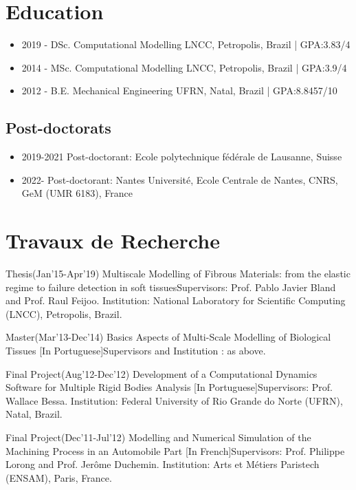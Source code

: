 \documentclass[french]{article}
\begin{document}
\section{Education}
\begin{itemize}
\item 2019 - DSc. Computational Modelling LNCC, Petropolis, Brazil | GPA:3.83/4 \vskip 0.1cm
\item 2014 - MSc. Computational Modelling LNCC, Petropolis, Brazil | GPA:3.9/4 \vskip 0.1cm
\item 2012 - B.E. Mechanical Engineering UFRN, Natal, Brazil | GPA:8.8457/10 %
\end{itemize}

\subsection{Post-doctorats}
\begin{itemize}
\item 2019-2021 Post-doctorant: Ecole polytechnique fédérale de Lausanne, Suisse
\item 2022- Post-doctorant: Nantes Université, Ecole Centrale de Nantes, CNRS, GeM (UMR 6183), France
\end{itemize}

\section{Travaux de Recherche}

\begin{description}
\item{Thesis}{(Jan'15-Apr'19) Multiscale Modelling of Fibrous Materials: from the elastic regime to failure detection in soft tissues}{}{Supervisors: Prof. Pablo Javier Bland and Prof. Raul Feijoo. \newline
		Institution: National Laboratory for Scientific Computing (LNCC), Petropolis, Brazil.
}
\item{Master}{(Mar'13-Dec'14) Basics Aspects of Multi-Scale Modelling of Biological Tissues [In Portuguese]}{}{Supervisors and Institution : as above.}
\item{Final Project}{(Aug'12-Dec'12) Development of a Computational Dynamics Software for Multiple Rigid Bodies Analysis [In Portuguese]}{}{Supervisors: Prof. Wallace Bessa. \newline
Institution: Federal University of Rio Grande do Norte (UFRN), Natal, Brazil.}
\item{Final Project}{(Dec'11-Jul'12) Modelling and Numerical Simulation of the Machining Process in an Automobile Part [In French]}{}{Supervisors: Prof. Philippe Lorong and Prof. Jerôme Duchemin. \newline
Institution: Arts et Métiers Paristech (ENSAM), Paris, France.}
\end{description}
\end{document}
